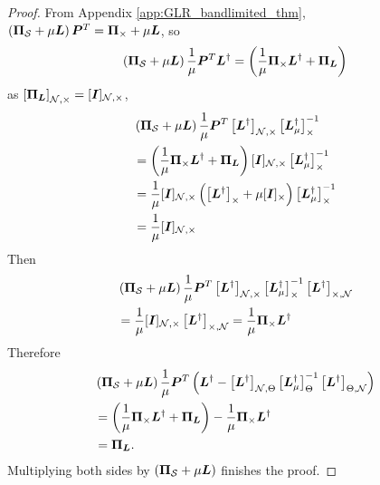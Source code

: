 \begin{proof}
    From Appendix \ref{app:GLR_bandlimited_thm}, $\left(\proj{S} + \mu\matr{L} \right)\matr{P}^{T} = \proj{\Theta} + \mu\matr{L}$, so
    \begin{align}
        \left(\proj{S} + \mu\matr{L}\right)\frac{1}{\mu}\matr{P}^{T}\matr{L}^{\dagger} = \left(\frac{1}{\mu}\proj{\Theta}\matr{L}^{\dagger} + \projgen{\matr{L}} \right)
    \end{align}
    as $\msub[N,\Theta]{\projgen{\matr{L}}} = \matrsub[N,\Theta]{I}$,
    \begin{align}
        &\left(\proj{S} + \mu\matr{L}\right)\frac{1}{\mu}\matr{P}^{T}\msub[N,\Theta]{\matr{L}^{\dagger}}\msub[\Theta]{\matr{L}^{\dagger}_{\mu}}^{-1} \\
        &= \left(\frac{1}{\mu}\proj{\Theta}\matr{L}^{\dagger} + \projgen{\matr{L}} \right)\matrsub[N,\Theta]{I}\msub[\Theta]{\matr{L}^{\dagger}_{\mu}}^{-1} \\
        &= \frac{1}{\mu}\matrsub[N,\Theta]{I} \left(\msub[\Theta]{\matr{L}^{\dagger}} + \mu\matrsub[\Theta]{I} \right)\msub[\Theta]{\matr{L}^{\dagger}_{\mu}}^{-1} \\
        &= \frac{1}{\mu}\matrsub[N,\Theta]{I}
    \end{align}
    Then
    \begin{align}
        &\left(\proj{S} + \mu\matr{L}\right)\frac{1}{\mu}\matr{P}^{T}\msub[N,\Theta]{\matr{L}^{\dagger}}\msub[\Theta]{\matr{L}^{\dagger}_{\mu}}^{-1}\msub[\Theta, N]{\matr{L}^{\dagger}} \\
        &= \frac{1}{\mu}\matrsub[N,\Theta]{I}\msub[\Theta, N]{\matr{L}^{\dagger}} = \frac{1}{\mu}\proj{\Theta}\matr{L}^{\dagger}
    \end{align}
Therefore
\begin{align}
    &\left(\proj{S} + \mu\matr{L}\right) \frac{1}{\mu}\matr{P}^{T}\left( \matr{L}^{\dagger} - \msubgen[\set{N},\Theta]{\matr{L}^{\dagger}} \msubgen[\Theta]{ \matr{L}^{\dagger}_{\mu}}^{-1}\msubgen[\Theta,\set{N}]{\matr{L}^{\dagger}}\right) \\
    &= \left(\frac{1}{\mu}\proj{\Theta}\matr{L}^{\dagger} + \projgen{\matr{L}} \right) - \frac{1}{\mu}\proj{\Theta}\matr{L}^{\dagger} \\
    &= \projgen{\matr{L}}.
\end{align}
Multiplying both sides by $\left(\proj{S} + \mu\matr{L}\right)$ finishes the proof.
\end{proof}

